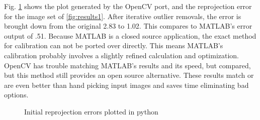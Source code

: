Fig. \ref{fig:cvrepro} shows the plot generated by the OpenCV port, and the reprojection error for the image set of \ref{fig:results1}. After iterative outlier removals, the error is brought down from the original 2.83 to 1.02. This compares to MATLAB's error output of .51. Because MATLAB is a closed source application, the exact method for calibration can not be ported over directly. This means MATLAB's calibration probably involves a slightly refined calculation and optimization. OpenCV has trouble matching MATLAB's results and its speed, but compared, but this method still provides an open source alternative. These results match or are even better than hand picking input images and saves time eliminating bad options. 

\begin{figure}[th]
	\centering
	\caption{Initial reprojection errors plotted in python}
	\label{fig:cvrepro}
\end{figure}